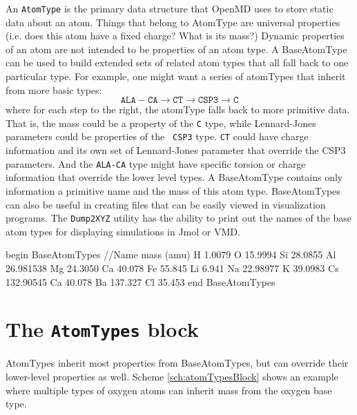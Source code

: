 \documentclass[letterpaper]{report}
\begin{document}
An {\tt AtomType} is the primary data structure that OpenMD uses to store
static data about an atom.  Things that belong to AtomType are
universal properties (i.e. does this atom have a fixed charge?  What
is its mass?)  Dynamic properties of an atom are not intended to be
properties of an atom type.  A BaseAtomType can be used to build
extended sets of related atom types that all fall back to one
particular type.  For example, one might want a series of atomTypes
that inherit from more basic types:
\begin{displaymath}
\mathtt{ALA-CA} \rightarrow \mathtt{CT} \rightarrow \mathtt{CSP3} \rightarrow \mathtt{C}
\end{displaymath}
where for each step to the right, the atomType falls back to more
primitive data.  That is, the mass could be a property of the {\tt C}
type, while Lennard-Jones parameters could be properties of the {\tt
  CSP3} type.  {\tt CT} could have charge information and its own set
of Lennard-Jones parameter that override the CSP3 parameters.  And the
{\tt ALA-CA} type might have specific torsion or charge information
that override the lower level types.  A BaseAtomType contains only
information a primitive name and the mass of this atom type.
BaseAtomTypes can also be useful in creating files that can be easily
viewed in visualization programs.  The {\tt Dump2XYZ} utility has the
ability to print out the names of the base atom types for displaying
simulations in Jmol or VMD.

\begin{code}[caption={[A simple example of a BaseAtomTypes
block.] A simple example of a BaseAtomTypes block.},
label={sch:baseAtomTypesBlock}] 
begin BaseAtomTypes
//Name  mass (amu)
H       1.0079
O       15.9994
Si      28.0855
Al      26.981538
Mg      24.3050
Ca      40.078
Fe      55.845
Li      6.941
Na      22.98977
K       39.0983
Cs      132.90545
Ca      40.078
Ba      137.327
Cl      35.453
end BaseAtomTypes
\end{code}

\section{\label{section:ffAtom}The {\tt AtomTypes} block}

AtomTypes inherit most properties from BaseAtomTypes, but can override
their lower-level properties as well.  Scheme \ref{sch:atomTypesBlock}
shows an example where multiple types of oxygen atoms can inherit mass
from the oxygen base type.
\end{document}
